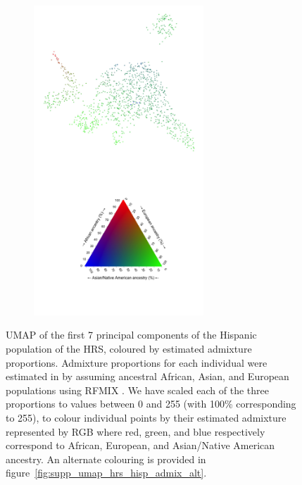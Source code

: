 \documentclass[12pt]{pnas-new}
\begin{document}
\begin{figure}
    \centering
    \begin{subfigure}{\textwidth}
    \includegraphics[width=0.7\textwidth]{images/HRS_1000G_NP1_UMAP_PC7_NC2_NN15_MD05_pca_hrshisp_added1kgp_2018115153245_admix.jpeg}
    \end{subfigure}
    \caption{UMAP of the first 7 principal components of the Hispanic population of the HRS, coloured by estimated admixture proportions. Admixture proportions for each individual were estimated in \cite{baharian2016great} by assuming ancestral African, Asian, and European populations using RFMIX \cite{Maples:2013fia}. We have scaled each of the three proportions to values between 0 and 255 (with 100\% corresponding to 255), to colour individual points by their estimated admixture represented by RGB where red, green, and blue respectively correspond to African, European, and Asian/Native American ancestry. An alternate colouring is provided in figure~\ref{fig:supp_umap_hrs_hisp_admix_alt}.}
    \label{fig:supp_umap_hrs_hisp_admix}
\end{figure}
\end{document}
